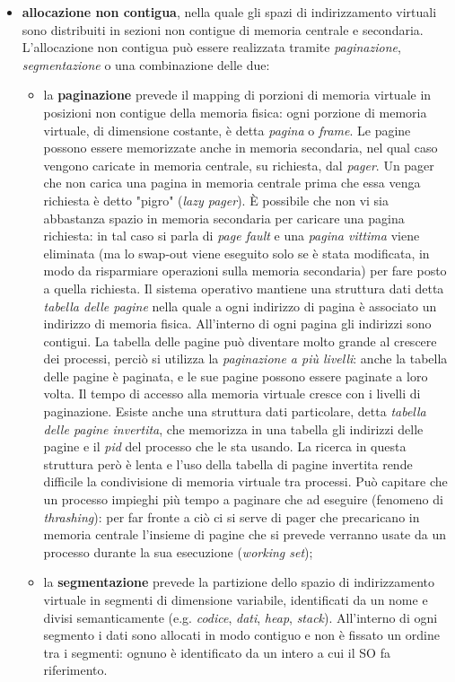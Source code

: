 \documentclass[answers,a4paper,12pt]{exam}
\begin{document}
\begin{questions}
\begin{solutionorlines}[3.8in]
\begin{itemize}
		\item \textbf{allocazione non contigua}, nella quale gli spazi di indirizzamento virtuali sono distribuiti in sezioni non contigue di memoria centrale e secondaria. L'allocazione non contigua può essere realizzata tramite \textit{paginazione}, \textit{segmentazione} o una combinazione delle due:
		\begin{itemize}
			\item la \textbf{paginazione} prevede il mapping di porzioni di memoria virtuale in posizioni non contigue della memoria fisica: ogni porzione di memoria virtuale, di dimensione costante, è detta \textit{pagina} o \textit{frame}. Le pagine possono essere memorizzate anche in memoria secondaria, nel qual caso vengono caricate in memoria centrale, su richiesta, dal \textit{pager}. Un pager che non carica una pagina in memoria centrale prima che essa venga richiesta è detto "pigro" (\textit{lazy pager}). È possibile che non vi sia abbastanza spazio in memoria secondaria per caricare una pagina richiesta: in tal caso si parla di \textit{page fault} e una \textit{pagina vittima} viene eliminata (ma lo swap-out viene eseguito solo se è stata modificata, in modo da risparmiare operazioni sulla memoria secondaria) per fare posto a quella richiesta. Il sistema operativo mantiene una struttura dati detta \textit{tabella delle pagine} nella quale a ogni indirizzo di pagina è associato un indirizzo di memoria fisica. All'interno di ogni pagina gli indirizzi sono contigui. La tabella delle pagine può diventare molto grande al crescere dei processi, perciò si utilizza la \textit{paginazione a più livelli}: anche la tabella delle pagine è paginata, e le sue pagine possono essere paginate a loro volta. Il tempo di accesso alla memoria virtuale cresce con i livelli di paginazione. Esiste anche una struttura dati particolare, detta \textit{tabella delle pagine invertita}, che memorizza in una tabella gli indirizzi delle pagine e il \textit{pid} del processo che le sta usando. La ricerca in questa struttura però è lenta e l'uso della tabella di pagine invertita rende difficile la condivisione di memoria virtuale tra processi. Può capitare che un processo impieghi più tempo a paginare che ad eseguire (fenomeno di \textit{thrashing}): per far fronte a ciò ci si serve di pager che precaricano in memoria centrale l'insieme di pagine che si prevede verranno usate da un processo durante la sua esecuzione (\textit{working set});
			\item la \textbf{segmentazione} prevede la partizione dello spazio di indirizzamento virtuale in segmenti di dimensione variabile, identificati da un nome e divisi semanticamente (e.g. \textit{codice}, \textit{dati}, \textit{heap}, \textit{stack}). All'interno di ogni segmento i dati sono allocati in modo contiguo e non è fissato un ordine tra i segmenti: ognuno è identificato da un intero a cui il SO fa riferimento.

\end{itemize}
\end{itemize}
\end{solutionorlines}
\end{questions}
\end{document}
